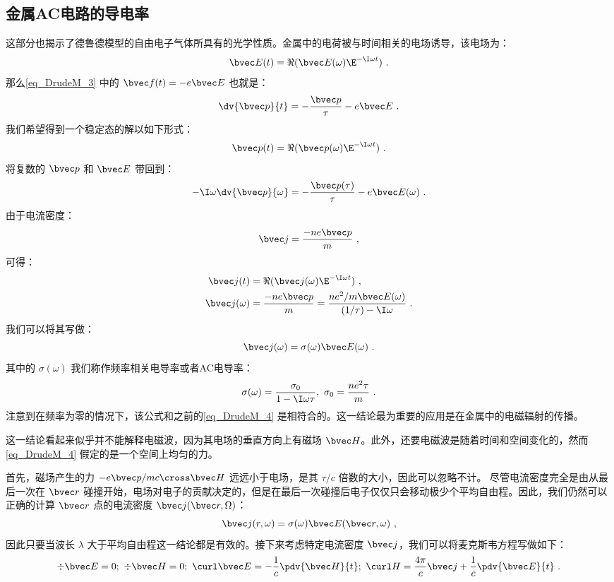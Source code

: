 \subsection{金属AC电路的导电率}
这部分也揭示了德鲁德模型的自由电子气体所具有的光学性质。金属中的电荷被与时间相关的电场诱导，该电场为：
\begin{equation}
\bvec E(t)=\Re(\bvec E(\omega)\E^{-\I\omega t})~.
\end{equation}
那么\autoref{eq_DrudeM_3} 中的 $\bvec f(t)=-e\bvec E$ 也就是：
\begin{equation}
\dv{\bvec p}{t}=-\frac{\bvec p}{\tau}-e\bvec E~.
\end{equation}
我们希望得到一个稳定态的解以如下形式：
\begin{equation}
\bvec p(t)=\Re(\bvec p(\omega)\E^{-\I\omega t})~.
\end{equation}
将复数的 $\bvec p$ 和 $\bvec E$ 带回到：
\begin{equation}
-\I\omega\dv{\bvec p}{\omega}=-\frac{\bvec p(\tau)}{\tau}-e\bvec E(\omega)~.
\end{equation}
由于电流密度：
\begin{equation}
\bvec j = \frac{-ne\bvec p}{m}~,
\end{equation}
可得：
\begin{align}
\bvec j(t)&=\Re(\bvec j(\omega)\E^{-\I\omega t})~,\\
\bvec j(\omega)&=\frac{-ne\bvec p}{m}=\frac{ne^2/m\bvec E(\omega)}{(1/\tau)-\I\omega}~.
\end{align}
我们可以将其写做：
\begin{equation}
\bvec j(\omega)=\sigma(\omega)\bvec E(\omega)~.
\end{equation}
其中的 $\sigma(\omega)$ 我们称作频率相关电导率或者AC电导率：
\begin{equation}
\sigma(\omega)=\frac{\sigma_0}{1-\I\omega\tau},\ \sigma_0=\frac{ne^2\tau}{m}~.
\end{equation}
注意到在频率为零的情况下，该公式和之前的\autoref{eq_DrudeM_4} 是相符合的。这一结论最为重要的应用是在金属中的电磁辐射的传播。

这一结论看起来似乎并不能解释电磁波，因为其电场的垂直方向上有磁场 $\bvec H$。此外，还要电磁波是随着时间和空间变化的，然而\autoref{eq_DrudeM_4} 假定的是一个空间上均匀的力。

首先，磁场产生的力 $-e\bvec p/mc\cross \bvec H$ 远远小于电场，是其 $\tau/c$ 倍数的大小，因此可以忽略不计。
尽管电流密度完全是由从最后一次在 $\bvec r$ 碰撞开始，电场对电子的贡献决定的，但是在最后一次碰撞后电子仅仅只会移动极少个平均自由程。因此，我们仍然可以正确的计算 $\bvec r$ 点的电流密度 $\bvec j(\bvec r,\Omega)$：
\begin{equation}
\bvec j(r,\omega)=\sigma(\omega)\bvec E(\bvec r,\omega)~,
\end{equation}
因此只要当波长 $\lambda$ 大于平均自由程这一结论都是有效的。接下来考虑特定电流密度 $\bvec j$，我们可以将麦克斯韦方程写做如下：
\begin{equation}
\div \bvec E =0;\ \div \bvec H = 0;\ \curl \bvec E =-\frac{1}{c}\pdv{ \bvec H}{t};\ \curl H = \frac{4\pi}{c}\bvec j+\frac{1}{c}\pdv{ \bvec E}{t}~.
\end{equation}

